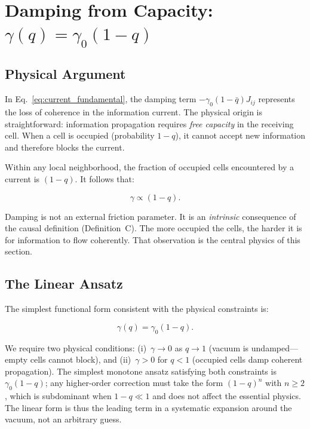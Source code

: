 \documentclass[aps,prd,twocolumn,showpacs,superscriptaddress,preprintnumbers]{revtex4-2}
\begin{document}
\section{Damping from Capacity: $\gamma(q)=\gamma_0(1-q)$}
\label{sec:gamma}

\subsection{Physical Argument}

In Eq.~\eqref{eq:current_fundamental}, the damping term $-\gamma_0(1-\bar{q})J_{ij}$ represents the loss of coherence in the information current.
The physical origin is straightforward: information propagation requires \emph{free capacity} in the receiving cell.
When a cell is occupied (probability $1-q$), it cannot accept new information and therefore blocks the current.

Within any local neighborhood, the fraction of occupied cells encountered by a current is $(1-q)$.
It follows that:

\begin{equation}
\gamma \propto (1-q).
\label{eq:gamma_scaling}
\end{equation}

Damping is not an external friction parameter.
It is an \emph{intrinsic} consequence of the causal definition (Definition~C).
The more occupied the cells, the harder it is for information to flow coherently.
That observation is the central physics of this section.

\subsection{The Linear Ansatz}

The simplest functional form consistent with the physical constraints is:

\begin{equation}
\boxed{\gamma(q) = \gamma_0 (1-q)}.
\label{eq:gamma_linear}
\end{equation}

We require two physical conditions: (i)~$\gamma\to0$ as $q\to1$ (vacuum is undamped---empty cells cannot block), and (ii)~$\gamma>0$ for $q<1$ (occupied cells damp coherent propagation). The simplest monotone ansatz satisfying both constraints is $\gamma_0(1-q)$; any higher-order correction must take the form $(1-q)^n$ with $n\ge2$, which is subdominant when $1-q\ll1$ and does not affect the essential physics. The linear form is thus the leading term in a systematic expansion around the vacuum, not an arbitrary guess.
\end{document}

